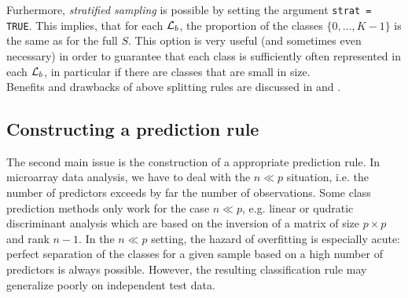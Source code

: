 Furhermore, \emph{stratified sampling} is possible by setting the
argument \texttt{strat = TRUE}. This implies, that for each $\mathcal L_b$, 
the proportion of the classes $\{0,\ldots,K-1 \}$ is the same as for 
the full $S$. This option is very useful (and sometimes even necessary)
in order to guarantee that each class is sufficiently often represented
in each $\mathcal L_b$, in particular if there are classes that are small in size.\\
Benefits and drawbacks of above splitting rules are discussed in 
\citet{BragaNeto} and \citet{Molinaro}.\\

\subsection{Constructing a prediction rule}\label{subsec:pred}
The second main issue is the construction of a appropriate prediction rule. 
In microarray data analysis, we
have to deal with the $n\ll p$ situation, i.e. the number of predictors
exceeds by far the number of observations. Some class prediction methods 
only work for the case $n \ll p$, e.g. linear or qudratic discriminant analysis
which are based on the inversion of a matrix of size $p\times p$ and rank $n-1$.
In the $n\ll p$ setting, the hazard of
overfitting is especially acute: perfect separation of the classes 
for a given sample based on a high number of predictors is always
possible. However, the resulting classification rule may generalize
poorly on independent test data.

